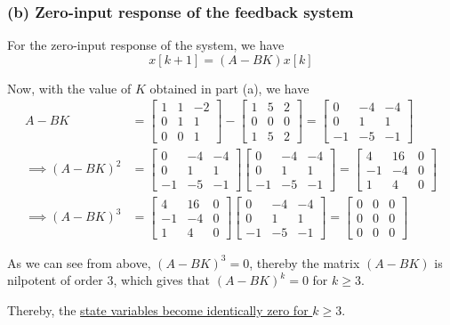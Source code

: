 \subsubsection*{(b) Zero-input response of the feedback system}

For the zero-input response of the system, we have
\begin{equation*}
    x[k+1] = (A - BK) x[k]
\end{equation*}

Now, with the value of \( K \) obtained in part (a), we have
\begin{align*}
    A - BK
     & =
    \begin{bmatrix}
        1 & 1 & -2 \\
        0 & 1 & 1  \\
        0 & 0 & 1
    \end{bmatrix}
    -
    \begin{bmatrix}
        1 & 5 & 2 \\
        0 & 0 & 0 \\
        1 & 5 & 2
    \end{bmatrix}
    =
    \begin{bmatrix}
        0  & -4 & -4 \\
        0  & 1  & 1  \\
        -1 & -5 & -1
    \end{bmatrix}
    \\
    \implies
    (A - BK)^2
     & =
    \begin{bmatrix}
        0  & -4 & -4 \\
        0  & 1  & 1  \\
        -1 & -5 & -1
    \end{bmatrix}
    \begin{bmatrix}
        0  & -4 & -4 \\
        0  & 1  & 1  \\
        -1 & -5 & -1
    \end{bmatrix}
    =
    \begin{bmatrix}
        4  & 16 & 0 \\
        -1 & -4 & 0 \\
        1  & 4  & 0
    \end{bmatrix}
    \\
    \implies
    (A - BK)^3
     & =
    \begin{bmatrix}
        4  & 16 & 0 \\
        -1 & -4 & 0 \\
        1  & 4  & 0
    \end{bmatrix}
    \begin{bmatrix}
        0  & -4 & -4 \\
        0  & 1  & 1  \\
        -1 & -5 & -1
    \end{bmatrix}
    =
    \begin{bmatrix}
        0 & 0 & 0 \\
        0 & 0 & 0 \\
        0 & 0 & 0
    \end{bmatrix}
\end{align*}

As we can see from above, \( {(A - BK)}^3 = 0 \), thereby the matrix \( (A - BK) \) is nilpotent of order 3, which gives that \( {(A - BK)}^k = 0 \) for \( k \geq 3 \).

Thereby, the \underline{state variables become identically zero for \( k \geq 3 \)}.
